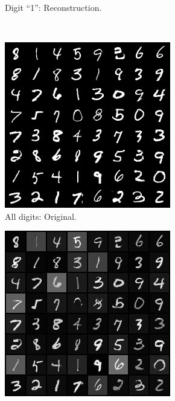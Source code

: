 \begin{figure}[h!]
\begin{subfigure}[b]{0.45\textwidth}
            \caption{\scriptsize Digit ``1'': Reconstruction.}
        \end{subfigure}
        \\
        \begin{subfigure}[b]{0.45\textwidth}
            \includegraphics[width=\textwidth]{Chapter5/results/mnist/all_digits_original.png}
            \caption{\scriptsize All digits: Original.}
        \end{subfigure}
        \begin{subfigure}[b]{0.45\textwidth}
            \includegraphics[width=\textwidth]{Chapter5/results/mnist/all_digits_reconstruction.png}

\end{subfigure}
\end{figure}
